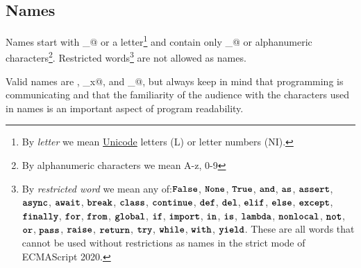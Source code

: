 \subsection*{Names}

Names start with \verb@_@ or a
letter\footnote{
By \emph{letter}
we mean \href{http://unicode.org/reports/tr44/}{\color{DarkBlue}Unicode} letters (L) or letter numbers (NI).
} and contain only \verb@_@
or alphanumeric characters\footnote{
By alphanumeric characters we mean A-z, 0-9
}. Restricted words\footnote{ By \emph{restricted word} we mean any of:$
\textbf{\texttt{False}}$, $\textbf{\texttt{None}}$, $\textbf{\texttt{True}}$, $\textbf{\texttt{and}}$, $\textbf{\texttt{as}}$, $\textbf{\texttt{assert}}$, $\textbf{\texttt{async}}$, $\textbf{\texttt{await}}$, $\textbf{\texttt{break}}$, $\textbf{\texttt{class}}$, $\textbf{\texttt{continue}}$, $\textbf{\texttt{def}}$, $\textbf{\texttt{del}}$, $\textbf{\texttt{elif}}$, $\textbf{\texttt{else}}$, $\textbf{\texttt{except}}$, $\textbf{\texttt{finally}}$, $\textbf{\texttt{for}}$, $\textbf{\texttt{from}}$, $\textbf{\texttt{global}}$, $\textbf{\texttt{if}}$, $\textbf{\texttt{import}}$, $\textbf{\texttt{in}}$, $\textbf{\texttt{is}}$, $\textbf{\texttt{lambda}}$, $\textbf{\texttt{nonlocal}}$, $\textbf{\texttt{not}}$, $\textbf{\texttt{or}}$, $\textbf{\texttt{pass}}$, $\textbf{\texttt{raise}}$, $\textbf{\texttt{return}}$, $\textbf{\texttt{try}}$, $\textbf{\texttt{while}}$, $\textbf{\texttt{with}}$, $\textbf{\texttt{yield}}$.
These are all words that cannot be used without restrictions as names in the strict mode of ECMAScript 2020.
} are not allowed as names.

Valid names are \verb@x@, \verb@_x@, \verb@X@ and \verb@X_@,
but always keep in mind that programming is communicating and that the familiarity of the
audience with the characters used in names is an important aspect of program readability.
